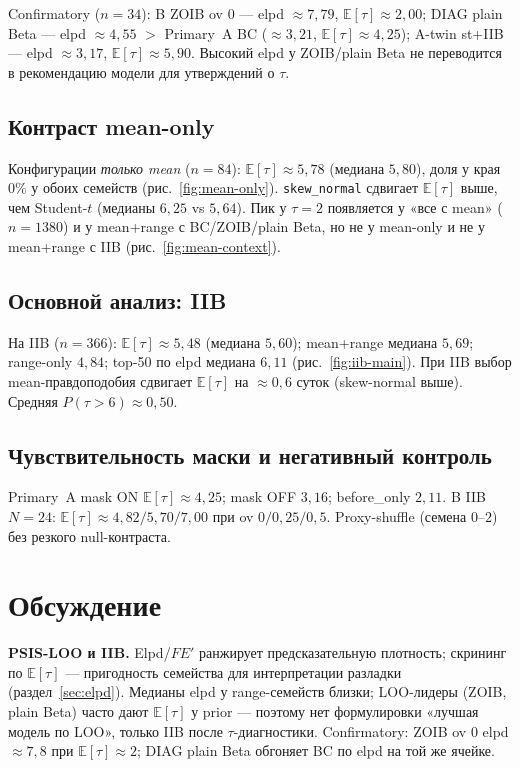 \documentclass{article}
\begin{document}
Confirmatory (\(n=34\)): B ZOIB ov \(0\) --- elpd \(\approx 7{,}79\), \(\mathbb{E}[\tau]\approx 2{,}00\); DIAG plain Beta --- elpd \(\approx 4{,}55\) \(>\) Primary~A BC (\(\approx 3{,}21\), \(\mathbb{E}[\tau]\approx 4{,}25\)); A-twin st+IIB --- elpd \(\approx 3{,}17\), \(\mathbb{E}[\tau]\approx 5{,}90\). Высокий elpd у ZOIB/plain Beta не переводится в рекомендацию модели для утверждений о \(\tau\).

\subsection{Контраст mean-only}

Конфигурации \emph{только mean} (\(n=84\)): \(\mathbb{E}[\tau]\approx 5{,}78\) (медиана \(5{,}80\)), доля у края \(0\%\) у обоих семейств (рис.~\ref{fig:mean-only}). \texttt{skew\_normal} сдвигает \(\mathbb{E}[\tau]\) выше, чем Student-\(t\) (медианы \(6{,}25\) vs \(5{,}64\)). Пик у \(\tau=2\) появляется у «все с mean» (\(n=1380\)) и у mean+range с BC/ZOIB/plain Beta, но не у mean-only и не у mean+range с IIB (рис.~\ref{fig:mean-context}).

\subsection{Основной анализ: IIB}

На IIB (\(n=366\)): \(\mathbb{E}[\tau]\approx 5{,}48\) (медиана \(5{,}60\)); mean+range медиана \(5{,}69\); range-only \(4{,}84\); top-50 по elpd медиана \(6{,}11\) (рис.~\ref{fig:iib-main}). При IIB выбор mean-правдоподобия сдвигает \(\mathbb{E}[\tau]\) на \(\approx 0{,}6\) суток (skew-normal выше). Средняя \(P(\tau>6)\approx 0{,}50\).

\subsection{Чувствительность маски и негативный контроль}

Primary~A mask ON \(\mathbb{E}[\tau]\approx 4{,}25\); mask OFF \(3{,}16\); before\_only \(2{,}11\). B IIB \(N=24\): \(\mathbb{E}[\tau]\approx 4{,}82/5{,}70/7{,}00\) при ov \(0/0{,}25/0{,}5\). Proxy-shuffle (семена \(0\)--\(2\)) без резкого null-контраста.


\section{Обсуждение}

\textbf{PSIS-LOO и IIB.} Elpd/\(F E'\) ранжирует предсказательную плотность; скрининг по \(\mathbb{E}[\tau]\) --- пригодность семейства для интерпретации разладки (раздел~\ref{sec:elpd}). Медианы elpd у range-семейств близки; LOO-лидеры (ZOIB, plain Beta) часто дают \(\mathbb{E}[\tau]\) у prior --- поэтому нет формулировки «лучшая модель по LOO», только IIB после \(\tau\)-диагностики. Confirmatory: ZOIB ov \(0\) elpd \(\approx 7{,}8\) при \(\mathbb{E}[\tau]\approx 2\); DIAG plain Beta обгоняет BC по elpd на той же ячейке.
\end{document}
